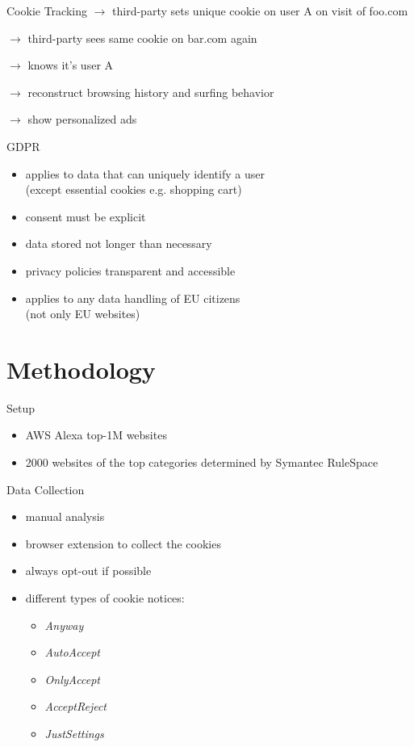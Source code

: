 \documentclass[xcolor={dvipsnames}]{beamer}
\begin{document}
\begin{frame}{Cookie Tracking}
    $\rightarrow$ third-party sets unique cookie on user A on visit of foo.com

    $\rightarrow$ third-party sees same cookie on bar.com again

    $\rightarrow$ knows it's user A

    $\rightarrow$ reconstruct browsing history and surfing behavior

    $\rightarrow$ show personalized ads
\end{frame}

\begin{frame}{GDPR}
    \begin{itemize}
        \item applies to data that can uniquely identify a user\\(except essential cookies e.g. shopping cart)
        \item consent must be explicit
        \item data stored not longer than necessary
        \item privacy policies transparent and accessible
        \item applies to any data handling of EU citizens\\(not only EU websites)
    \end{itemize}
\end{frame}

\section{Methodology}

\begin{frame}{Setup}
	\begin{itemize}
		\item AWS Alexa top-1M websites
		\item 2000 websites of the top categories determined by Symantec RuleSpace
	\end{itemize}
\end{frame}

\begin{frame}{Data Collection}
    \begin{itemize}
        \item manual analysis
        \item browser extension to collect the cookies
        \item always opt-out if possible
        \item different types of cookie notices:
            \begin{itemize}
                \item \emph{Anyway}
                \item \emph{AutoAccept}
                \item \emph{OnlyAccept}
                \item \emph{AcceptReject}
                \item \emph{JustSettings}
            \end{itemize}
    \end{itemize}
\end{frame}
\end{document}
